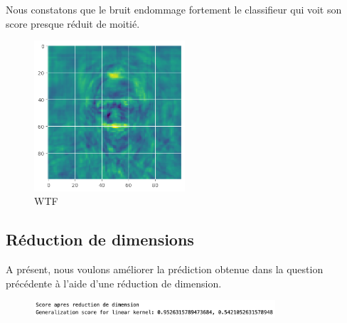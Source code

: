 \documentclass[a4paper,12pt]{article}
\begin{document}
Nous constatons que le bruit endommage fortement le classifieur qui voit son score presque réduit de moitié.

\begin{figure}[H]
    \centering
    \includegraphics[width=0.5\textwidth]{Images/coeff_visage.png}
    \caption{WTF}\label{fig : ?}
\end{figure}

\subsection{Réduction de dimensions}

A présent, nous voulons améliorer la prédiction obtenue dans la question précédente à l'aide d'une réduction de
dimension.
\begin{figure}[H]
    \centering
    \includegraphics[width=0.8\textwidth]{Images/apres_reduction.png}
    \caption{}\label{fig : dim}
\end{figure}
\end{document}
